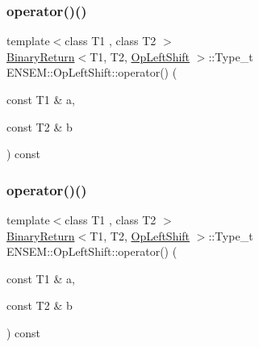 \subsubsection{\texorpdfstring{operator()()}{operator()()}\hspace{0.1cm}{\footnotesize\ttfamily [1/3]}}
{\footnotesize\ttfamily template$<$class T1 , class T2 $>$ \\
\mbox{\hyperlink{structENSEM_1_1BinaryReturn}{Binary\+Return}}$<$T1, T2, \mbox{\hyperlink{structENSEM_1_1OpLeftShift}{Op\+Left\+Shift}} $>$\+::Type\+\_\+t E\+N\+S\+E\+M\+::\+Op\+Left\+Shift\+::operator() (\begin{DoxyParamCaption}\item[{const T1 \&}]{a,  }\item[{const T2 \&}]{b }\end{DoxyParamCaption}) const\hspace{0.3cm}{\ttfamily [inline]}}

\mbox{\label{structENSEM_1_1OpLeftShift_adf50631f48cb1f93f10fdb26256f19b6}} 
\subsubsection{\texorpdfstring{operator()()}{operator()()}\hspace{0.1cm}{\footnotesize\ttfamily [2/3]}}
{\footnotesize\ttfamily template$<$class T1 , class T2 $>$ \\
\mbox{\hyperlink{structENSEM_1_1BinaryReturn}{Binary\+Return}}$<$T1, T2, \mbox{\hyperlink{structENSEM_1_1OpLeftShift}{Op\+Left\+Shift}} $>$\+::Type\+\_\+t E\+N\+S\+E\+M\+::\+Op\+Left\+Shift\+::operator() (\begin{DoxyParamCaption}\item[{const T1 \&}]{a,  }\item[{const T2 \&}]{b }\end{DoxyParamCaption}) const\hspace{0.3cm}{\ttfamily [inline]}}

\mbox{\label{structENSEM_1_1OpLeftShift_adf50631f48cb1f93f10fdb26256f19b6}} 
